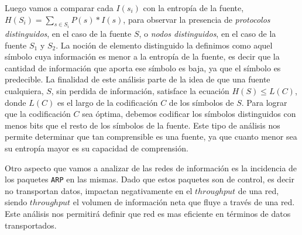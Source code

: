 Luego vamos a comparar cada $I(s_{i})$ con la entropía de la fuente, $H(S_{i}) = \sum\limits_{s \in S_{i}} P(s) * I(s)$, para observar la presencia de \emph{protocolos distinguidos}, en el caso de la fuente $S$, o \emph{nodos distinguidos}, en el caso de la fuente $S_{1}$ y $S_{2}$. La noción de elemento distinguido la definimos como aquel símbolo cuya información es menor a la entropía de la fuente, es decir que la cantidad de información que aporta ese símbolo es baja, ya que el símbolo es predecible. La finalidad de este análisis parte de la idea de que una fuente cualquiera, $S$, sin perdida de información, satisface la ecuación $H(S) \leq L(C)$, donde $L(C)$ es el largo de la codificación $C$ de los símbolos de $S$. Para lograr que la codificación $C$ sea óptima, debemos codificar los símbolos distinguidos con menos bits que el resto de los símbolos de la fuente. Este tipo de análisis nos permite determinar que tan comprensible es una fuente, ya que cuanto menor sea su entropía mayor es su capacidad de comprensión.

Otro aspecto que vamos a analizar de las redes de información es la incidencia de los paquetes \texttt{ARP} en las mismas. Dado que estos paquetes son de control, es decir no transportan datos, impactan negativamente en el $throughput$ de una red, siendo $throughput$ el volumen de información neta que fluye a través de una red. Este análisis nos permitirá definir que red es mas eficiente en términos de datos transportados.
